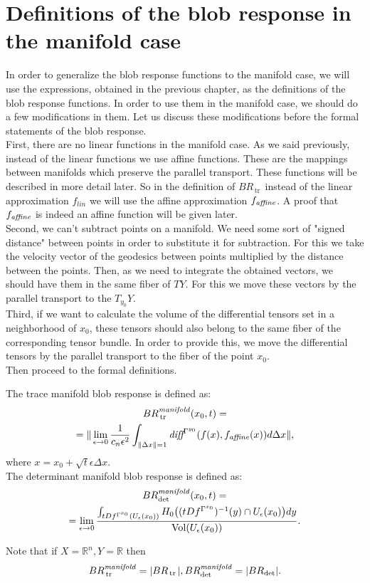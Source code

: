 \documentclass[twocolumn]{svjour3}          %
\newcommand{\Vol}{\mathop{\rm Vol}}
\newcommand{\diff}{\textit{diff}}
\newcommand{\affine}{\mathop{\it affine}}
\newcommand{\manifold}{\mathop{\it manifold}}
\newcommand{\Ueps}{U_{\epsilon}}
\newcommand{\limeps}{\lim_{\epsilon \to 0}}
\newcommand{\delx}{\Delta x}
\newcommand{\R}{\mathbb{R}}
\newcommand{\Rn}{{\mathbb{R}}^n}
\newcommand{\TangentSpaceArg}[2]{{T_{#2}}{#1}}
\newcommand{\TangentBundle}[1]{T{#1}}
\newcommand {\tr}{{\,}\mathrm{tr}{\,}}
\begin{document}
\section{Definitions of the blob response in the manifold case}
In order to generalize the blob response functions to the manifold case, we will use the expressions, obtained in the previous chapter, as the definitions of the blob response functions. In order to use them in the manifold case, we should do a few modifications in them. Let us discuss these modifications before the formal statements of the blob response.
\\
First, there are no linear functions in the manifold case. As we said previously, instead of the linear functions we use affine functions. These are the mappings between manifolds which preserve the parallel transport. These functions will be described in more detail later. So in the definition of $BR_{\tr}$ instead of the linear approximation $f_{lin}$ we will use the affine approximation $f_{\affine}$. A proof that $f_{\affine}$ is indeed an affine function will be given later.
\\
Second, we can't subtract points on a manifold. We need some sort of "signed distance" between points in order to substitute it for subtraction. For this we take the velocity vector of the geodesics between points multiplied by the distance between the points. Then, as we need to integrate the obtained vectors, we should have them in the same fiber of $\TangentBundle{Y}$. For this we move these vectors by the parallel transport to the $\TangentSpaceArg{Y}{y_0}$.
\\
Third, if we want to calculate the volume of the differential tensors set in a neighborhood of $x_0$, these tensors should also belong to the same fiber of the corresponding tensor bundle. In order to provide this, we move the differential tensors by the parallel transport to the fiber of the point $x_0$.
\\
Then proceed to the formal definitions. 

\begin{definition} \label{ManifoldBlobResponse}
The trace manifold blob response is defined as:
\begin{multline*}BR_{\tr}^{\manifold}(x_0, t) = \\
=\|\limeps \frac{1}{c_n \epsilon^2}  
 \int_{\| \delx \| = 1} \diff^{\Gamma^{y_0}}(f(x), f_{\affine}(x)) d\delx \|,
\end{multline*}
where $x=x_0 + \sqrt{t}\epsilon \delx$.
\\
The determinant manifold blob response is defined as:
\begin{multline*}BR_{\det}^{\manifold}(x_0, t) = \\
 =\limeps \frac{
		\int_{tDf^{\Gamma^{x_0}}(\Ueps(x_0))} H_0 \big((tDf^{\Gamma^{x_0}})^{-1}(y) \cap \Ueps(x_0) \big) dy} 
		{\Vol(\Ueps(x_0))}. \end{multline*}

\end{definition}
Note that if $X=\Rn, Y=\R$ then 
$$BR_{\tr}^{\manifold} = |BR_{\tr}|, BR_{\det}^{\manifold} = |BR_{\det}|.$$
\end{document}
